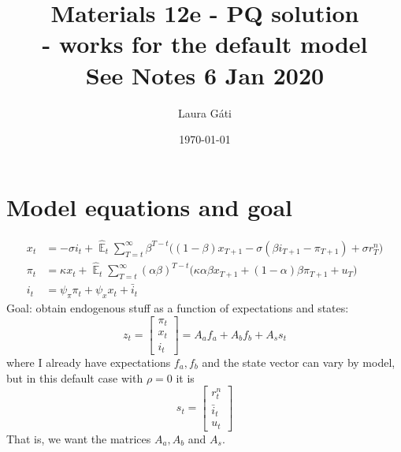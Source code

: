\documentclass[11pt]{article}
\renewcommand{\[}{\begin{equation}}
\renewcommand{\]}{\end{equation}}
\DeclareMathOperator{\E}{\mathbb{E}}
\begin{document}
\linespread{1.0}

\title{Materials 12e - PQ solution\\
- works for the default model
\\
\small{See Notes 6 Jan 2020}}
\author{Laura G\'ati} 
\date{\today}
\maketitle




\section{Model equations and goal}
\begin{align}
x_t &=  -\sigma i_t +\hat{\E}_t \sum_{T=t}^{\infty} \beta^{T-t }\big( (1-\beta)x_{T+1} - \sigma(\beta i_{T+1} - \pi_{T+1}) +\sigma r_T^n \big)  \label{prestons18}  \\
\pi_t &= \kappa x_t +\hat{\E}_t \sum_{T=t}^{\infty} (\alpha\beta)^{T-t }\big( \kappa \alpha \beta x_{T+1} + (1-\alpha)\beta \pi_{T+1} + u_T\big) \label{prestons19}  \\
i_t &= \psi_{\pi}\pi_t + \psi_{x} x_t  + \bar{i}_t \label{TR}
\end{align}
Goal: obtain endogenous stuff as a function of expectations and states:
\begin{equation}
z_t = \begin{bmatrix} \pi_t \\ x_t \\ i_t \end{bmatrix} = A_a f_{a} + A_b f_{b} + A_s s_t
\end{equation}
where I already have expectations $f_a, f_b$ and the state vector can vary by model, but in this default case with $\rho=0$ it is \begin{equation}
s_t = \begin{bmatrix} r_t^n \\ \bar{i}_t \\ u_t \end{bmatrix}
\end{equation}
That is,  we want the matrices $A_a, A_b$ and $A_s$.
\end{document}
